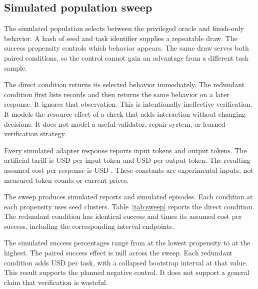 \documentclass{article}
\begin{document}
\subsection{Simulated population sweep}
The simulated population selects between the privileged oracle and finish-only behavior. A hash of seed and task identifier supplies a repeatable draw. The success propensity controls which behavior appears. The same draw serves both paired conditions, so the control cannot gain an advantage from a different task sample.\par
The direct condition returns its selected behavior immediately. The redundant condition first lists records and then returns the same behavior on a later response. It ignores that observation. This is intentionally ineffective verification. It models the resource effect of a check that adds interaction without changing decisions. It does not model a useful validator, repair system, or learned verification strategy.\par
Every simulated adapter response reports \InputTokens{} input tokens and \OutputTokens{} output tokens. The artificial tariff is USD \InputTariff{} per input token and USD \OutputTariff{} per output token. The resulting assumed cost per response is USD \PerTurnCost{}. These constants are experimental inputs, not measured token counts or current prices.\par
The sweep produces \PopulationRuns{} simulated reports and \PopulationEpisodes{} simulated episodes. Each condition at each propensity uses \SeedCount{} seed clusters. Table~\ref{tab:sweep} reports the direct condition. The redundant condition has identical success and \CostMultiplier{} times its assumed cost per success, including the corresponding interval endpoints.\par
\begin{table}[ht]\centering\small\caption{Simulated direct population results. Intervals are 95\% seed-cluster bootstrap intervals. Propensity is a simulation input; observed success is an output.}\label{tab:sweep}\end{table}

The simulated success percentages range from \LowRate{} at the lowest propensity to \HighRate{} at the highest. The paired success effect is null across the sweep. Each redundant condition adds USD \ExtraCost{} per task, with a collapsed bootstrap interval at that value. This result supports the planned negative control. It does not support a general claim that verification is wasteful.\par
\end{document}
